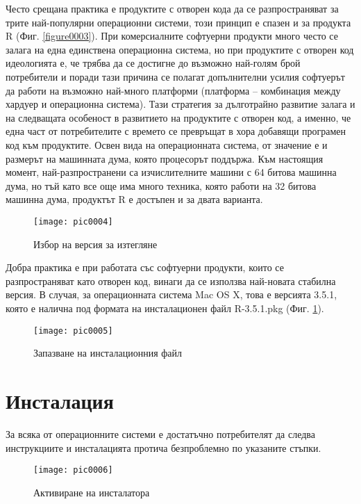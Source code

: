 Често срещана практика е продуктите с отворен кода да се разпространяват за трите най-популярни операционни системи, този принцип е спазен и за продукта R (Фиг. \ref{figure0003}). При комерсиалните софтуерни продукти много често се залага на една единствена операционна система, но при продуктите с отворен код идеологията е, че трябва да се достигне до възможно най-голям брой потребители и поради тази причина се полагат допълнителни усилия софтуерът да работи на възможно най-много платформи (платформа – комбинация между хардуер и операционна система). Тази стратегия за дълготрайно развитие залага и на следващата особеност в развитието на продуктите с отворен код, а именно, че една част от потребителите с времето се превръщат в хора добавящи програмен код към продуктите. Освен вида на операционната система, от значение е и размерът на машинната дума, която процесорът поддържа. Към настоящия момент, най-разпространени са изчислителните машини с 64 битова машинна дума, но тъй като все още има много техника, която работи на 32 битова машинна дума, продуктът R е достъпен и за двата варианта.

\begin{figure}[h]
  \centering
  \texttt{[image: pic0004]}
  \caption{Избор на версия за изтегляне}
\label{figure0004}
\end{figure}
\FloatBarrier

Добра практика е при работата със софтуерни продукти, които се разпространяват като отворен код, винаги да се използва най-новата стабилна версия. В случая, за операционната система Mac OS X, това е версията 3.5.1, която е налична под формата на инсталационен файл R-3.5.1.pkg (Фиг. \ref{figure0004}).

\begin{figure}[h]
  \centering
  \texttt{[image: pic0005]}
  \caption{Запазване на инсталационния файл}
\label{figure0005}
\end{figure}
\FloatBarrier

\section{Инсталация}

За всяка от операционните системи е достатъчно потребителят да следва инструкциите и инсталацията протича безпроблемно по указаните стъпки. 

\begin{figure}[h]
  \centering
  \texttt{[image: pic0006]}
  \caption{Активиране на инсталатора}
\label{figure0006}
\end{figure}
\FloatBarrier

